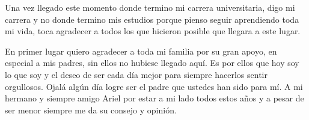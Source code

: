 \begin{acknowledgements}

Una vez llegado este momento donde termino mi carrera universitaria, digo mi carrera y no donde termino mis estudios porque pienso seguir aprendiendo toda mi vida, toca agradecer a todos los que hicieron posible que llegara a este lugar.

En primer lugar quiero agradecer a toda mi familia por su gran apoyo, en especial a mis padres, sin ellos no hubiese llegado aqu\'i. Es por ellos que hoy soy lo que soy y el deseo de ser cada d\'ia mejor para siempre hacerlos sentir orgullosos. Ojal\'a alg\'un d\'ia logre ser el padre que ustedes han sido para m\'i. A mi hermano y siempre amigo Ariel por estar a mi lado todos estos a\~nos y a pesar de ser menor siempre me da su consejo y opini\'on.

\end{acknowledgements}
